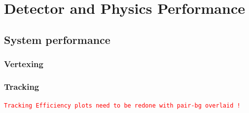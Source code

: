 \newcommand{\fix}[1]{\textcolor{red}{\texttt{#1}}} %

\chapter{Detector and Physics Performance}

\section{System performance}

\subsection{Vertexing}

\subsection{Tracking}

\fix{Tracking Efficiency plots need to be redone with pair-bg overlaid !}

